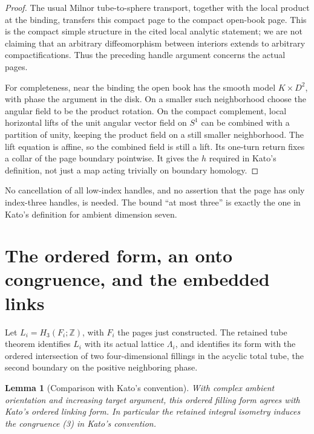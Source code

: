 \documentclass[11pt]{article}
\newtheorem{lemma}[theorem]{Lemma}
\newcommand{\Z}{\mathbb Z}
\begin{document}
\begin{proof}
The usual Milnor tube-to-sphere transport, together with the local
product at the binding, transfers this compact page to the compact
open-book page. This is the compact simple structure in the cited
local analytic statement; we are not claiming that an arbitrary
diffeomorphism between interiors extends to arbitrary compactifications.
Thus the preceding handle argument concerns the actual pages.

For completeness, near the binding the open book has the smooth
model \(K\times D^2\), with phase the argument in the disk.
On a smaller such neighborhood choose the angular field to be
the product rotation. On the compact complement, local horizontal
lifts of the unit angular vector field on \(S^1\) can be combined
with a partition of unity, keeping the product field on a still
smaller neighborhood. The lift equation is affine, so the combined
field is still a lift. Its one-turn return fixes a collar of the
page boundary pointwise. It gives the \(h\) required in Kato's
definition, not just a map acting trivially on boundary homology.
\end{proof}

No cancellation of all low-index handles, and no assertion that the
page has only index-three handles, is needed. The bound ``at most
three'' is exactly the one in Kato's definition for ambient dimension
seven.

\section{The ordered form, an onto congruence, and the embedded links}

Let \(L_i=H_3(F_i;\Z)\), with \(F_i\) the pages just constructed.
The retained tube theorem identifies \(L_i\) with its actual lattice
\(\Lambda_i\), and identifies its form with the ordered intersection
of two four-dimensional fillings in the acyclic total tube, the
second boundary on the positive neighboring phase.

\begin{lemma}[Comparison with Kato's convention]\label{lem:convention}
With complex ambient orientation and increasing target argument,
this ordered filling form agrees with Kato's ordered linking form.
In particular the retained integral isometry induces the congruence
(3) in Kato's convention.
\end{lemma}
\end{document}
